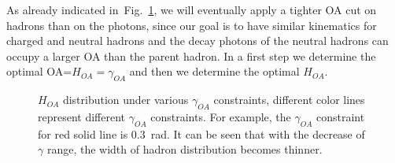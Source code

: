 As already indicated in~Fig.~\ref{fig:OAs}, we will eventually apply a tighter OA cut on hadrons than on the photons, since our goal is to have similar kinematics for charged and neutral hadrons and the decay photons of the neutral hadrons can occupy a larger OA than the parent hadron. In a first step we determine the optimal OA=$H_{OA}=\gamma_{OA}$ and then we determine the optimal $H_{OA}$.
\begin{figure}[h]
  \centering     %
  \caption{$H_{OA}$ distribution under various $\gamma_{OA}$ constraints, different color lines represent different $\gamma_{OA}$ constraints. For example, the $\gamma_{OA}$ constraint for red solid line is 0.3~rad. It can be seen that with the decrease of $\gamma$ range, the width of hadron distribution becomes thinner.}
  \label{fig:OAs}
\end{figure}

